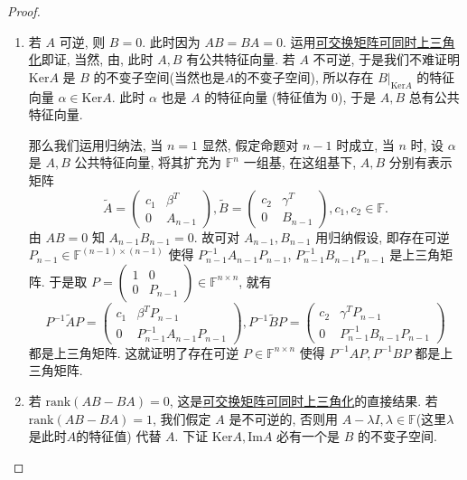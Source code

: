 \documentclass[../../main.tex]{subfiles}%
\begin{document}
\begin{proof}
\begin{enumerate}
\item 若 \( A \) 可逆, 则 \( B = 0 \). 此时因为 \( AB = BA = 0 \). 运用\hyperref[proposition:一族两两可交换的一般域上的矩阵可同时上三角化]{可交换矩阵可同时上三角化}即证, 当然, 由, 此时 \( A, B \) 有公共特征向量. 若 \( A \) 不可逆, 于是我们不难证明 \( \mathrm{Ker} A \) 是 \( B \) 的不变子空间(当然也是$A$的不变子空间), 所以存在 \( B|_{\mathrm{Ker} A} \) 的特征向量 \( \alpha \in \mathrm{Ker} A \). 此时 \( \alpha \) 也是 \( A \) 的特征向量 (特征值为 0), 于是 \( A, B \) 总有公共特征向量.

那么我们运用归纳法, 当 \( n = 1 \) 显然, 假定命题对 \( n - 1 \) 时成立, 当 \( n \) 时, 设 \( \alpha \) 是 \( A, B \) 公共特征向量, 将其扩充为 \( \mathbb{F}^n \) 一组基, 在这组基下, \( A, B \) 分别有表示矩阵
\[
\widetilde{A} = \begin{pmatrix} c_1 & \beta^T \\ 0 & A_{n - 1} \end{pmatrix}, \widetilde{B} = \begin{pmatrix} c_2 & \gamma^T \\ 0 & B_{n - 1} \end{pmatrix}, c_1, c_2 \in \mathbb{F}.
\]
由 \( AB = 0 \) 知 \( A_{n - 1}B_{n - 1} = 0 \). 故可对 \( A_{n - 1}, B_{n - 1} \) 用归纳假设, 即存在可逆 \( P_{n - 1} \in \mathbb{F}^{(n - 1) \times (n - 1)} \) 使得 $P_{n - 1}^{-1}A_{n - 1}P_{n - 1}$, $P_{n - 1}^{-1}$$B_{n - 1}$$P_{n - 1}$ 是上三角矩阵. 于是取 \( P = \begin{pmatrix} 1 & 0 \\ 0 & P_{n - 1} \end{pmatrix} \in \mathbb{F}^{n \times n} \), 就有
\[
P^{-1}\widetilde{A}P = \begin{pmatrix} c_1 & \beta^T P_{n - 1} \\ 0 & P_{n - 1}^{-1}A_{n - 1}P_{n - 1} \end{pmatrix}, P^{-1}\widetilde{B}P = \begin{pmatrix} c_2 & \gamma^T P_{n - 1} \\ 0 & P_{n - 1}^{-1}B_{n - 1}P_{n - 1} \end{pmatrix}
\]
都是上三角矩阵. 这就证明了存在可逆 \( P \in \mathbb{F}^{n \times n} \) 使得 \( P^{-1}AP, P^{-1}BP \) 都是上三角矩阵.

\item 若 \( \mathrm{rank}(AB - BA) = 0 \), 这是\hyperref[proposition:一族两两可交换的一般域上的矩阵可同时上三角化]{可交换矩阵可同时上三角化}的直接结果. 若 \( \mathrm{rank}(AB - BA) = 1 \), 我们假定 \( A \) 是不可逆的, 否则用 \( A - \lambda I, \lambda \in \mathbb{F} \)(这里$\lambda$是此时$A$的特征值) 代替 \( A \). 下证 \( \mathrm{Ker} A, \mathrm{Im} A \) 必有一个是 \( B \) 的不变子空间.


\end{enumerate}
\end{proof}
\end{document}
